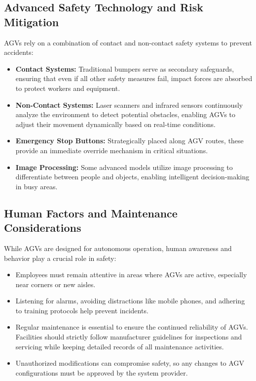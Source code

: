 \documentclass[../../main]{subfiles}
\begin{document}
\subsection{Advanced Safety Technology and Risk Mitigation}
AGVs rely on a combination of contact and non-contact safety 
systems to prevent accidents:
\begin{itemize}
    \item \textbf{Contact Systems:} Traditional bumpers serve as 
          secondary safeguards, ensuring that even if all other 
          safety measures fail, impact forces are absorbed to 
          protect workers and equipment.
    \item \textbf{Non-Contact Systems:} Laser scanners and infrared 
          sensors continuously analyze the environment to detect 
          potential obstacles, enabling AGVs to adjust their movement 
          dynamically based on real-time conditions.
    \item \textbf{Emergency Stop Buttons:} Strategically placed along 
          AGV routes, these provide an immediate override mechanism 
          in critical situations.
    \item \textbf{Image Processing:} Some advanced models utilize image 
          processing to differentiate between people and objects, 
          enabling intelligent decision-making in busy areas.
\end{itemize}

\subsection{Human Factors and Maintenance Considerations}
While AGVs are designed for autonomous operation, human awareness 
and behavior play a crucial role in safety:
\begin{itemize}
    \item Employees must remain attentive in areas where AGVs are 
          active, especially near corners or new aisles.
    \item Listening for alarms, avoiding distractions like mobile 
          phones, and adhering to training protocols help prevent 
          incidents.
    \item Regular maintenance is essential to ensure the continued 
          reliability of AGVs. Facilities should strictly follow 
          manufacturer guidelines for inspections and servicing 
          while keeping detailed records of all maintenance activities.
    \item Unauthorized modifications can compromise safety, so any 
          changes to AGV configurations must be approved by the 
          system provider.
\end{itemize}
\end{document}
